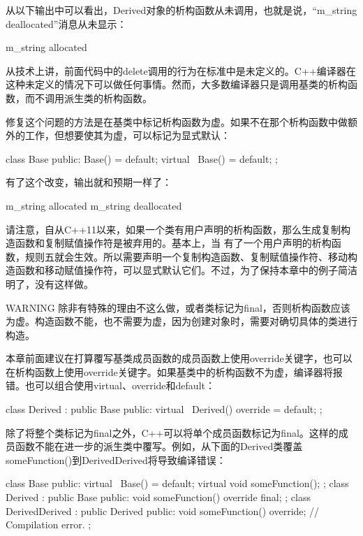 从以下输出中可以看出，Derived对象的析构函数从未调用，也就是说，“m\_string deallocated”消息从未显示：

\begin{cpp}
m_string allocated
\end{cpp}

从技术上讲，前面代码中的delete调用的行为在标准中是未定义的。C++编译器在这种未定义的情况下可以做任何事情。然而，大多数编译器只是调用基类的析构函数，而不调用派生类的析构函数。

修复这个问题的方法是在基类中标记析构函数为虚。如果不在那个析构函数中做额外的工作，但想要使其为虚，可以标记为显式默认：

\begin{cpp}
class Base
{
    public:
        Base() = default;
        virtual ~Base() = default;
};
\end{cpp}

有了这个改变，输出就和预期一样了：

\begin{shell}
m_string allocated
m_string deallocated
\end{shell}

请注意，自从C++11以来，如果一个类有用户声明的析构函数，那么生成复制构造函数和复制赋值操作符是被弃用的。基本上，当 有了一个用户声明的析构函数，规则五就会生效。所以需要声明一个复制构造函数、复制赋值操作符、移动构造函数和移动赋值操作符，可以显式默认它们。不过，为了保持本章中的例子简洁明了，没有这样做。

\begin{myWarning}{WARNING}
除非有特殊的理由不这么做，或者类标记为final，否则析构函数应该为虚。构造函数不能，也不需要为虚，因为创建对象时，需要对确切具体的类进行构造。
\end{myWarning}

本章前面建议在打算覆写基类成员函数的成员函数上使用override关键字，也可以在析构函数上使用override关键字。如果基类中的析构函数不为虚，编译器将报错。也可以组合使用virtual、override和default：

\begin{cpp}
class Derived : public Base
{
    public:
        virtual ~Derived() override = default;
};
\end{cpp}


除了将整个类标记为final之外，C++可以将单个成员函数标记为final。这样的成员函数不能在进一步的派生类中覆写。例如，从下面的Derived类覆盖someFunction()到DerivedDerived将导致编译错误：

\begin{cpp}
class Base
{
    public:
        virtual ~Base() = default;
        virtual void someFunction();
};
class Derived : public Base
{
    public:
        void someFunction() override final;
};
class DerivedDerived : public Derived
{
    public:
        void someFunction() override; // Compilation error.
};
\end{cpp}






